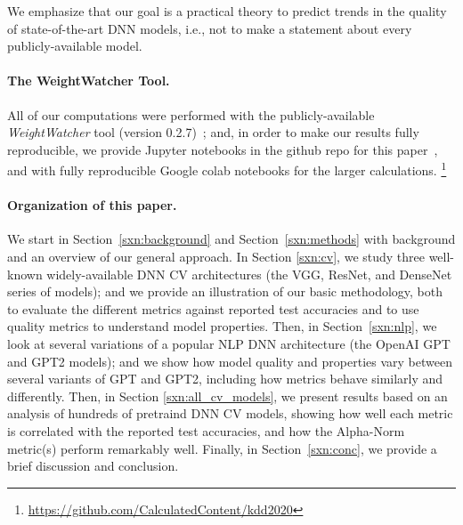 \noindent
We emphasize that our goal is a practical theory to predict trends in the quality of state-of-the-art DNN models, i.e., not to make a statement about every publicly-available model.

\paragraph{The WeightWatcher Tool.}

All of our computations were performed with the publicly-available \emph{WeightWatcher} tool (version 0.2.7)~\cite{weightwatcher_package};
and, in order to make our results fully reproducible, we provide Jupyter notebooks in the github repo for this paper~\cite{repo},
and with fully reproducible Google colab notebooks for the larger calculations.%
\footnote{\url{https://github.com/CalculatedContent/kdd2020} }


\paragraph{Organization of this paper.}

We start in Section~\ref{sxn:background} and Section~\ref{sxn:methods} with background and an overview of our general approach.
In Section \ref{sxn:cv}, we study three well-known widely-available DNN CV architectures (the VGG, ResNet, and DenseNet series of models); and we provide an illustration of our basic methodology, both to evaluate the different metrics against reported test accuracies and to use quality metrics to understand model properties.
Then, in Section~\ref{sxn:nlp}, we look at several variations of a popular NLP DNN architecture (the OpenAI GPT and GPT2 models); and we show how model quality and properties vary between several variants of GPT and GPT2, including how metrics behave similarly and differently.
Then, in Section \ref{sxn:all_cv_models}, we present results based on an analysis of hundreds of pretraind DNN CV models, showing how well each metric is correlated with the reported test accuracies, and how the Alpha-Norm metric(s) perform remarkably well.
Finally, in Section~\ref{sxn:conc}, we provide a brief discussion and conclusion.



